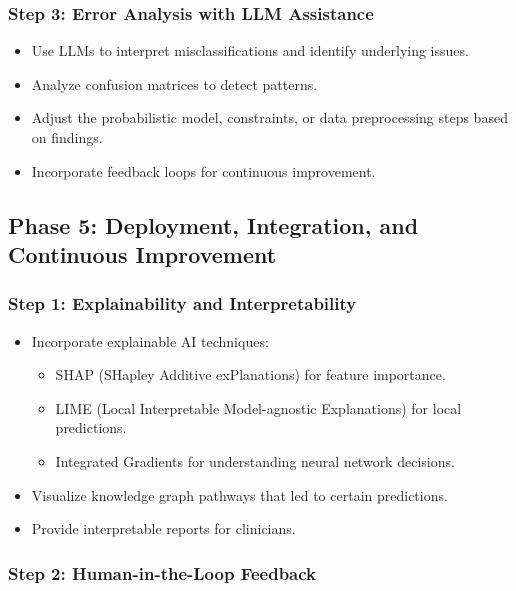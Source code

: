 \documentclass[12pt, a4paper]{article}
\begin{document}
\subsubsection{Step 3: Error Analysis with LLM Assistance}

\begin{itemize}
    \item Use LLMs to interpret misclassifications and identify underlying issues.
    \item Analyze confusion matrices to detect patterns.
    \item Adjust the probabilistic model, constraints, or data preprocessing steps based on findings.
    \item Incorporate feedback loops for continuous improvement.
\end{itemize}

\subsection{Phase 5: Deployment, Integration, and Continuous Improvement}

\subsubsection{Step 1: Explainability and Interpretability}

\begin{itemize}
    \item Incorporate explainable AI techniques:
    \begin{itemize}
        \item SHAP (SHapley Additive exPlanations) for feature importance.
        \item LIME (Local Interpretable Model-agnostic Explanations) for local predictions.
        \item Integrated Gradients for understanding neural network decisions.
    \end{itemize}
    \item Visualize knowledge graph pathways that led to certain predictions.
    \item Provide interpretable reports for clinicians.
\end{itemize}

\subsubsection{Step 2: Human-in-the-Loop Feedback}
\end{document}
